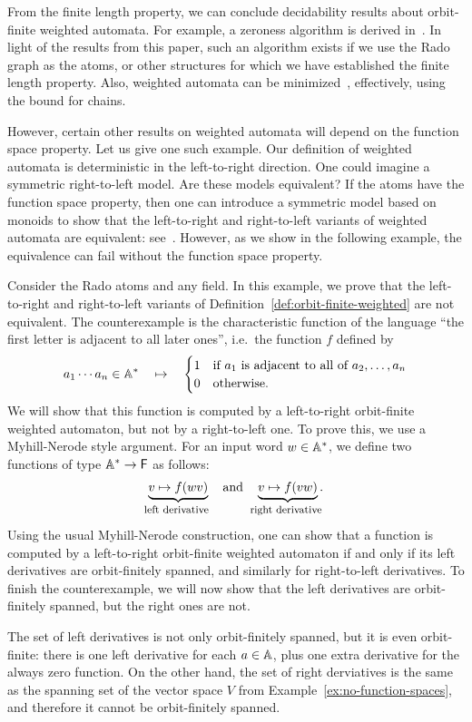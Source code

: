 From the finite length property, we can conclude decidability results about orbit-finite weighted automata. 
For example, a zeroness algorithm is derived in~\cite[Sec. 5]{BFKM24}. 
In light of the results from this paper, such an algorithm exists if we use the Rado graph as the atoms, or other structures for which we have established the finite length property. Also, weighted automata can be minimized~\cite[Sec. 7]{BFKM24}, effectively, using the bound for chains.

However, certain other results on weighted automata will depend on the function space property. Let us give one such example. Our  definition of weighted automata  is deterministic in the left-to-right direction. One could imagine a symmetric right-to-left model. Are these models equivalent? If the atoms have the function space property, then one can introduce a symmetric model based on monoids to show that the left-to-right and right-to-left variants of weighted automata are equivalent: see~\cite[Thm. 7.4]{BFKM24}. However, as we show in the following example, the equivalence can fail without the  function space property.

\begin{myexample}
 Consider the Rado atoms and any field. In this example, we prove that the left-to-right and right-to-left variants of  Definition~\ref{def:orbit-finite-weighted} are not equivalent. The counterexample is  the characteristic function of the language ``the first letter is adjacent to all later ones'', i.e.~the function $f$ defined by 
 \begin{align*}
 a_1 \cdots a_n \in \mathbb{A}^* \quad \mapsto \quad 
 \begin{cases}
    1 & \text{if  $a_1$ is adjacent to all of $a_2,\ldots,a_{n}$}\\
    0 & \text{otherwise.}
 \end{cases}
 \end{align*}
 We will show that this function is computed by a left-to-right  orbit-finite weighted automaton, but not by a right-to-left one. To prove this, we use a Myhill-Nerode style argument. For an input word $w \in \mathbb{A}^*$, we define two functions of type $\mathbb{A}^* \to \mathsf{F}$ as follows:
\begin{align*}
\myunderbrace{v \mapsto f(wv)}{left derivative}
\quad \text{and} \quad 
\myunderbrace{v \mapsto f(vw)}{right derivative}.
\end{align*}
Using the usual Myhill-Nerode construction, one can show that a function is computed by a left-to-right orbit-finite weighted automaton if and only if its left derivatives are orbit-finitely spanned, and similarly for right-to-left derivatives. To finish the counterexample, we will now show that the left derivatives are orbit-finitely spanned, but the right ones are not.

The set of left derivatives is not only orbit-finitely spanned, but it is even orbit-finite: there is one left derivative for each $a \in \mathbb{A}$, plus one extra derivative for the always zero function. On the other hand, the set of right derviatives is the same as the spanning set of the vector space $V$ from Example~\ref{ex:no-function-spaces}, and therefore it cannot be orbit-finitely spanned.  
\end{myexample}

